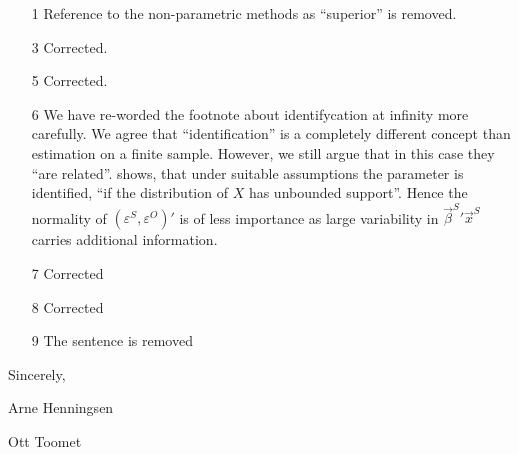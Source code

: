 \documentclass[a4paper]{article}
\begin{document}
\begin{itemize}
\item[1] Reference to the non-parametric methods as ``superior'' is
  removed.
\item[3] Corrected.
\item[5] Corrected.
\item[6] We have re-worded the footnote about identifycation at
  infinity more carefully.  We agree that ``identification'' is a
  completely different concept than estimation on a finite sample.
  However, we still argue that in this case they ``are related''.
  \cite[p. 205]{chamberlain1986} shows, that under suitable
  assumptions the parameter is identified, ``if the distribution of
  $X$ has unbounded support''.  Hence the normality of
  $(\varepsilon^{S}, \varepsilon^{O})'$ is of less importance as large
  variability in ${\vec{\beta}^{S}}' \vec{x}^{S}$ carries additional
  information.
\item[7] Corrected
\item[8] Corrected
\item[9] The sentence is removed
\end{itemize}

\bigskip

Sincerely,

\bigskip

Arne Henningsen

Ott Toomet



\end{document}
